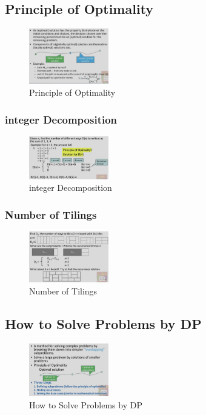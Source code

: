 \subsection{Principle of Optimality}
\begin{figure}[H]
    \centering
    \includegraphics[width=0.309\textwidth]{pic/DAA8/Principle of Optimality}
    \caption{Principle of Optimality}
\end{figure}

\subsubsection{integer Decomposition}
\begin{figure}[H]
    \centering
    \includegraphics[width=0.309\textwidth]{pic/DAA8/integer Decomposition}
    \caption{integer Decomposition}
\end{figure}

\subsubsection{Number of Tilings}
\begin{figure}[H]
    \centering
    \includegraphics[width=0.309\textwidth]{pic/DAA8/Number of Tilings}
    \caption{Number of Tilings}
\end{figure}

\subsection{How to Solve Problems by DP}

\begin{figure}[H]
    \centering
    \includegraphics[width=0.309\textwidth]{pic/DAA8/How to Solve Problems by DP}
    \caption{How to Solve Problems by DP}
\end{figure}

